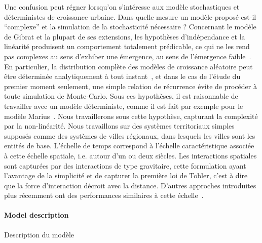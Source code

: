 {Une confusion peut régner lorsqu'on s'intéresse aux modèle stochastiques et déterministes de croissance urbaine. Dans quelle mesure un modèle proposé est-il ``complexe'' et la simulation de la stochasticité nécessaire ?  Concernant le modèle de Gibrat et la plupart de ses extensions, les hypothèses d'indépendance et la linéarité produisent un comportement totalement prédicable, ce qui ne les rend pas complexes au sens d'exhiber une émergence, au sens de l'émergence faible~\cite{bedau2002downward}. En particulier, la distribution complète des modèles de croissance aléatoire peut être déterminée analytiquement à tout instant~\cite{gabaix1999zipf}, et dans le cas de l'étude du premier moment seulement, une simple relation de récurrence évite de procéder à toute simulation de Monte-Carlo. Sous ces hypothèses, il est raisonnable de travailler avec un modèle déterministe, comme il est fait par exemple pour le modèle Marius~\cite{cottineau2014evolution}. Nous travaillerons sous cette hypothèse, capturant la complexité par la non-linéarité. Nous travaillons sur des systèmes territoriaux simples supposés comme des systèmes de villes régionaux, dans lesquels les villes sont les entités de base. L'échelle de temps correspond à l'échelle caractéristique associée à cette échelle spatiale, i.e. autour d'un ou deux siècles. Les interactions spatiales sont capturées par des interactions de type gravitaire, cette formulation ayant l'avantage de la simplicité et de capturer la première loi de Tobler, c'est à dire que la force d'interaction décroit avec la distance. D'autres approches introduites plus récemment ont des performances similaires à cette échelle~\cite{masucci2013gravity}. 
}

\paragraph{Model description}{Description du modèle}

